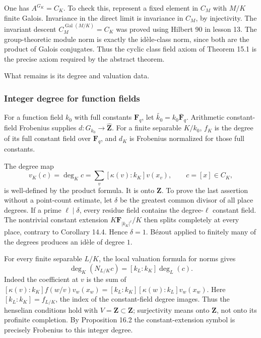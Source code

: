 \documentclass[11pt,a4paper]{article}
\begin{document}
One has \(A^{G_K}=C_K\). To check this, represent a fixed element in
\(C_M\) with \(M/K\) finite Galois. Invariance in the direct limit is
invariance in \(C_M\), by injectivity. The invariant descent
\(C_M^{\operatorname{Gal}(M/K)}=C_K\) was proved using Hilbert 90 in
lesson 13. The group-theoretic module norm is exactly the idèle-class
norm, since both are the product of Galois conjugates. Thus the cyclic
class field axiom of Theorem 15.1 is the precise axiom required by the
abstract theorem.

What remains is its degree and valuation data.

\subsubsection{Integer degree for function
fields}\label{integer-degree-for-function-fields}

For a function field \(k_0\) with full constants \(\mathbf F_q\), let
\(\widetilde{k_0}=k_0\overline{\mathbf F}_q\). Arithmetic constant-field
Frobenius supplies \(d:G_{k_0}\to\widehat{\mathbf Z}\). For a finite
separable \(K/k_0\), \(f_K\) is the degree of its full constant field
over \(\mathbf F_q\), and \(d_K\) is Frobenius normalized for those full
constants.

The degree map \[
v_K(c)=\deg_K c=\sum_v[\kappa(v):k_K]v(x_v),
\qquad c=[x]\in C_K,
\tag{8}
\] is well-defined by the product formula. It is onto \(\mathbf Z\). To
prove the last assertion without a point-count estimate, let \(\delta\)
be the greatest common divisor of all place degrees. If a prime
\(\ell\mid\delta\), every residue field contains the degree-\(\ell\)
constant field. The nontrivial constant extension
\(K\mathbf F_{|k_K|^\ell}/K\) then splits completely at every place,
contrary to Corollary 14.4. Hence \(\delta=1\). Bézout applied to
finitely many of the degrees produces an idèle of degree \(1\).

For every finite separable \(L/K\), the local valuation formula for
norms gives \[
\deg_K(N_{L/K}c)=[k_L:k_K]\deg_L(c).
\tag{9}
\] Indeed the coefficient at \(v\) is the sum of
\([\kappa(v):k_K]f(w/v)v_w(x_w)
=[k_L:k_K][\kappa(w):k_L]v_w(x_w)\). Here \([k_L:k_K]=f_{L/K}\), the
index of the constant-field degree images. Thus the henselian conditions
hold with \(V=\mathbf Z\subset\widehat{\mathbf Z}\); surjectivity means
onto \(\mathbf Z\), not onto its profinite completion. By Proposition
16.2 the constant-extension symbol is precisely Frobenius to this
integer degree.
\end{document}
